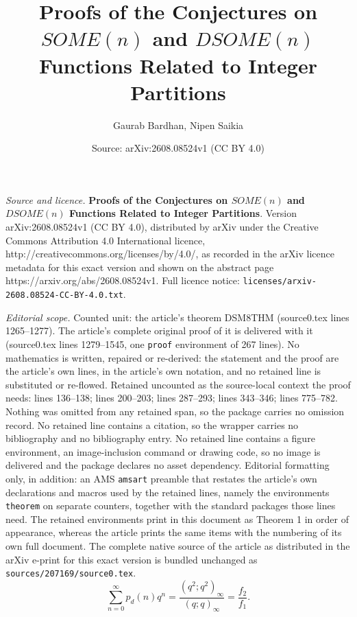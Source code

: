 \documentclass[10pt,a4paper]{amsart}
\title{\textbf{Proofs of the Conjectures on $SOME(n)$ and $DSOME(n)$ Functions Related to Integer Partitions}}
\author{Gaurab Bardhan, Nipen Saikia}
\date{Source: arXiv:2608.08524v1 (CC BY 4.0)}
\begin{document}
\maketitle

\noindent\emph{Source and licence.} \textbf{Proofs of the Conjectures on $SOME(n)$ and $DSOME(n)$ Functions Related to Integer Partitions}. Version arXiv:2608.08524v1 (CC BY 4.0), distributed by arXiv under the Creative Commons Attribution 4.0 International licence, http://creativecommons.org/licenses/by/4.0/, as recorded in the arXiv licence metadata for this exact version and shown on the abstract page https://arxiv.org/abs/2608.08524v1. Full licence notice: \texttt{licenses/arxiv-2608.08524-CC-BY-4.0.txt}.\par\smallskip

\noindent\textit{Editorial scope.} Counted unit: the article's theorem DSM8THM (source0.tex lines 1265--1277). The article's complete original proof of it is delivered with it (source0.tex lines 1279--1545, one \texttt{proof} environment of 267 lines). No mathematics is written, repaired or re-derived: the statement and the proof are the article's own lines, in the article's own notation, and no retained line is substituted or re-flowed.  Retained uncounted as the source-local context the proof needs: lines 136--138; lines 200--203; lines 287--293; lines 343--346; lines 775--782.  Nothing was omitted from any retained span, so the package carries no omission record.  No retained line contains a citation, so the wrapper carries no bibliography and no bibliography entry.  No retained line contains a figure environment, an image-inclusion command or drawing code, so no image is delivered and the package declares no asset dependency.  Editorial formatting only, in addition: an AMS \texttt{amsart} preamble that restates the article's own declarations and macros used by the retained lines, namely the environments \texttt{theorem} on separate counters, together with the standard packages those lines need.  The retained environments print in this document as Theorem 1 in order of appearance, whereas the article prints the same items with the numbering of its own full document.  The complete native source of the article as distributed in the arXiv e-print for this exact version is bundled unchanged as \texttt{sources/207169/source0.tex}.
\begin{equation}\label{DSM8M25}
\sum_{n=0}^{\infty}p_{d}(n)q^n=\dfrac{(q^2;q^2)_\infty}{(q;q)_\infty}=\dfrac{f_2}{f_1}.   
\end{equation}
\end{document}
